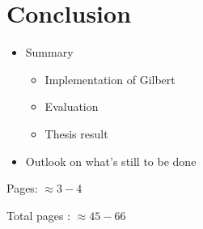 \chapter{Conclusion}
\label{cha:conclusion}


\begin{itemize}
	\item Summary
	\begin{itemize}
		\item Implementation of Gilbert
		\item Evaluation
		\item Thesis result
	\end{itemize}
	\item Outlook on what's still to be done
\end{itemize}

Pages: $\approx 3-4$

Total pages : $\approx 45 - 66$